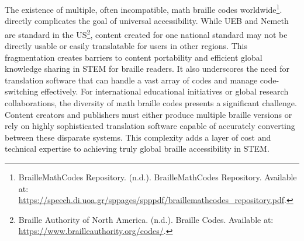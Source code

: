 The existence of multiple, often incompatible, math braille codes worldwide\footnote{BrailleMathCodes Repository. (n.d.). BrailleMathCodes Repository. Available at: \url{https://speech.di.uoa.gr/sppages/spppdf/braillemathcodes_repository.pdf}.}. directly complicates the goal of universal accessibility. While UEB and Nemeth are standard in the US\footnote{Braille Authority of North America. (n.d.). Braille Codes. Available at: \url{https://www.brailleauthority.org/codes/}.}, content created for one national standard may not be directly usable or easily translatable for users in other regions. This fragmentation creates barriers to content portability and efficient global knowledge sharing in STEM for braille readers. It also underscores the need for translation software that can handle a vast array of codes and manage code-switching effectively. For international educational initiatives or global research collaborations, the diversity of math braille codes presents a significant challenge. Content creators and publishers must either produce multiple braille versions or rely on highly sophisticated translation software capable of accurately converting between these disparate systems. This complexity adds a layer of cost and technical expertise to achieving truly global braille accessibility in STEM.

